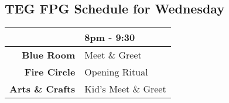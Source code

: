 
 \begin{center}
\section{TEG FPG Schedule for Wednesday}

\begin{tabular}{|r|l|}
\hline
 & \textbf{8pm - 9:30} \\
\hline
\textbf{Blue Room} & Meet \& Greet \\
\hline
\textbf{Fire Circle} & Opening Ritual \\
\hline
\textbf{Arts \& Crafts} & Kid's Meet \& Greet \\
\hline
\end{tabular}
\end{center}